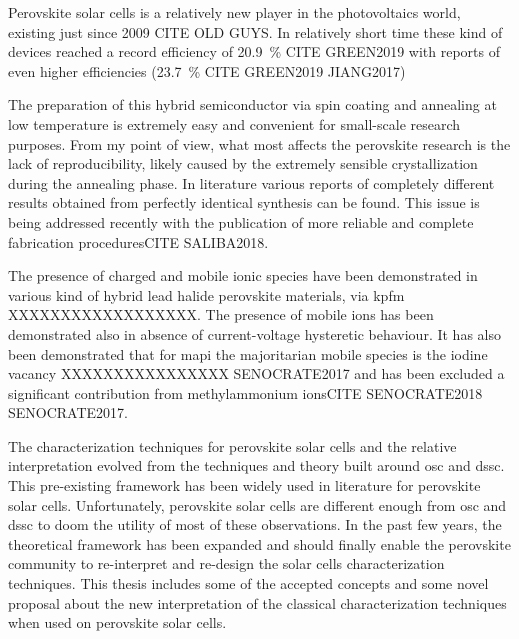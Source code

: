 	Perovskite solar cells is a relatively new player in the photovoltaics world, existing just since 2009 CITE OLD GUYS. In relatively short time these kind of devices reached a record efficiency of 20.9~\% CITE GREEN2019 with reports of even higher efficiencies (23.7~\% CITE GREEN2019 JIANG2017)


	
		The preparation of this hybrid semiconductor via spin coating and annealing at low temperature is extremely easy and convenient for small-scale research purposes. From my point of view, what most affects the perovskite research is the lack of reproducibility, likely caused by the extremely sensible crystallization during the annealing phase. In literature various reports of completely different results obtained from perfectly identical synthesis can be found\cite{Pockett2015,Gottesman2014}. This issue is being addressed recently with the publication of more reliable and complete fabrication proceduresCITE SALIBA2018.

	
		The presence of charged and mobile ionic species have been demonstrated in various kind of hybrid lead halide perovskite materials, via \gls{kpfm}\cite{Birkhold2018} XXXXXXXXXXXXXXXXXX. The presence of mobile ions has been demonstrated also in absence of current-voltage hysteretic behaviour\cite{Calado2016,Jacobs2018}. It has also been demonstrated that for \gls{mapi} the majoritarian mobile species is the iodine vacancy XXXXXXXXXXXXXXXX SENOCRATE2017 and has been excluded a significant contribution from methylammonium ionsCITE SENOCRATE2018 SENOCRATE2017.

	
	The characterization techniques for perovskite solar cells and the relative interpretation evolved from the techniques and theory built around \gls{osc} and \gls{dssc}. This pre-existing framework has been widely used in literature for perovskite solar cells. Unfortunately, perovskite solar cells are different enough from \gls{osc} and \gls{dssc} to doom the utility of most of these observations. In the past few years, the theoretical framework has been expanded and should finally enable the perovskite community to re-interpret and re-design the solar cells characterization techniques. This thesis includes some of the accepted concepts and some novel proposal about the new interpretation of the classical characterization techniques when used on perovskite solar cells. 

